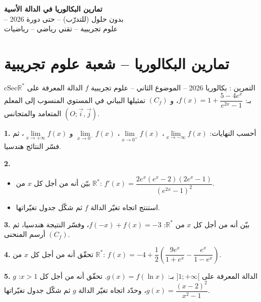 \documentclass[12pt,a4paper]{article}
\newenvironment{BOX}[2]{\begin{otherlanguage}{english}\begin{arbox}{#1}{#2}}{\end{arbox}\end{otherlanguage}}
\newcounter{exo}
\newenvironment{tamrin}[1]{\stepcounter{exo}\begin{BOX}{cSec}{التمرين \theexo: #1}}{\end{BOX}}
\newenvironment{LTR}{\begin{otherlanguage}{english}}{\end{otherlanguage}}
\newcommand{\R}{\mathbb{R}}
\newenvironment{sq}{\begin{itemize}[leftmargin=2.4em,itemsep=3pt]}{\end{itemize}}
\newcommand{\qa}{\item[(أ)]}\newcommand{\qb}{\item[(ب)]}\newcommand{\qc}{\item[(جـ)]}\newcommand{\qd}{\item[(د)]}\newcommand{\qe}{\item[(هـ)]}
\newcommand{\QQ}[1]{\par\smallskip\textbf{#1.} }
\begin{document}
\begin{LTR}
\begin{tcolorbox}[enhanced,colback=cSec,colframe=cSec,arc=3mm,halign=center,boxrule=0pt,top=12pt,bottom=12pt,before upper={\selectlanguage{arabic}}]
{\color{white}\fontsize{26}{32}\selectfont\bfseries تمارين البكالوريا في الدالة الأسية}\\[8pt]
{\color{white}\large -- بدون حلول (للتدرّب) -- حتى دورة 2026}\\[5pt]
{\color{white}\large علوم تجريبية -- تقني رياضي -- رياضيات}
\end{tcolorbox}
\end{LTR}
\section{تمارين البكالوريا -- شعبة علوم تجريبية}
\begin{tamrin}{بكالوريا 2026 -- الموضوع الثاني -- علوم تجريبية}
$f$ الدالة المعرفة على $\R^{*}$ بـ: $f(x)=1+\dfrac{5-4e^{x}}{e^{2x}-1}$، و $(C_f)$ تمثيلها البياني في المستوي المنسوب إلى المعلم المتعامد والمتجانس $(O;\vec i,\vec j)$.
\QQ{1} أحسب النهايات: $\lim\limits_{x\to-\infty}f(x)$، $\lim\limits_{x\to0^{+}}f(x)$، $\lim\limits_{x\to0^{-}}f(x)$ و $\lim\limits_{x\to+\infty}f(x)$، ثم فسّر النتائج هندسيا.
\QQ{2}
\begin{sq}
\qa بيّن أنه من أجل كل $x$ من $\R^{*}$: $f'(x)=\dfrac{2e^{x}\left(e^{x}-2\right)\left(2e^{x}-1\right)}{\left(e^{2x}-1\right)^{2}}$.
\qb استنتج اتجاه تغيّر الدالة $f$ ثم شكّل جدول تغيّراتها.
\end{sq}
\QQ{3} بيّن أنه من أجل كل $x$ من $\R^{*}$: $f(-x)+f(x)=-3$، وفسّر النتيجة هندسيا، ثم أرسم المنحنى $(C_f)$.
\QQ{4} تحقّق أنه من أجل كل $x$ من $\R^{*}$: $f(x)=-4+\dfrac{1}{2}\left(\dfrac{9e^{x}}{1+e^{x}}-\dfrac{e^{x}}{1-e^{x}}\right)$.
\QQ{5} $g$ الدالة المعرفة على $]1;+\infty[$ بـ: $g(x)=f(\ln x)$.
تحقّق أنه من أجل كل $x>1$: $g(x)=\dfrac{(x-2)^{2}}{x^{2}-1}$، وحدّد اتجاه تغيّر الدالة $g$ ثم شكّل جدول تغيّراتها.
\end{tamrin}
\end{document}
